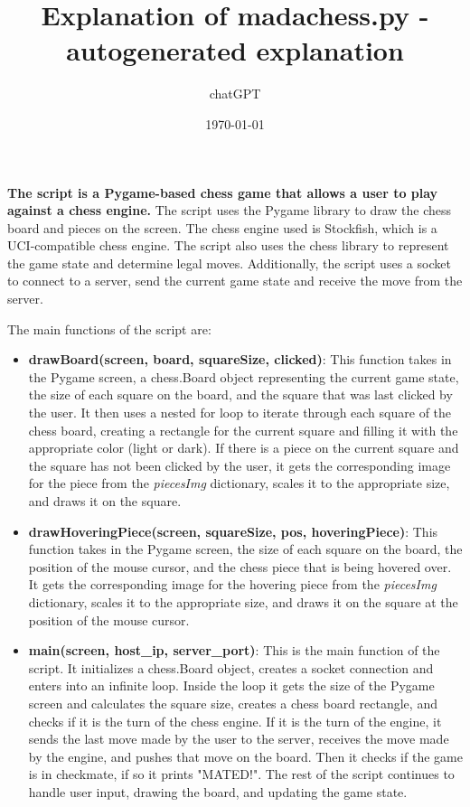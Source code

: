 \documentclass{article}
\title{Explanation of madachess.py - autogenerated explanation}
\author{chatGPT}
\date{\today}
\begin{document}
\maketitle
\textbf{The script is a Pygame-based chess game that allows a user to play against a chess engine.} The script uses the Pygame library to draw the chess board and pieces on the screen. The chess engine used is Stockfish, which is a UCI-compatible chess engine. The script also uses the chess library to represent the game state and determine legal moves. Additionally, the script uses a socket to connect to a server, send the current game state and receive the move from the server.

The main functions of the script are:

\begin{itemize}
    \item \textbf{drawBoard(screen, board, squareSize, clicked)}: This function takes in the Pygame screen, a chess.Board object representing the current game state, the size of each square on the board, and the square that was last clicked by the user. It then uses a nested for loop to iterate through each square of the chess board, creating a rectangle for the current square and filling it with the appropriate color (light or dark). If there is a piece on the current square and the square has not been clicked by the user, it gets the corresponding image for the piece from the \textit{piecesImg} dictionary, scales it to the appropriate size, and draws it on the square.
    \item \textbf{drawHoveringPiece(screen, squareSize, pos, hoveringPiece)}: This function takes in the Pygame screen, the size of each square on the board, the position of the mouse cursor, and the chess piece that is being hovered over. It gets the corresponding image for the hovering piece from the \textit{piecesImg} dictionary, scales it to the appropriate size, and draws it on the square at the position of the mouse cursor.
    \item \textbf{main(screen, host\_ip, server\_port)}: This is the main function of the script. It initializes a chess.Board object, creates a socket connection and enters into an infinite loop. Inside the loop it gets the size of the Pygame screen and calculates the square size, creates a chess board rectangle, and checks if it is the turn of the chess engine. If it is the turn of the engine, it sends the last move made by the user to the server, receives the move made by the engine, and pushes that move on the board. Then it checks if the game is in checkmate, if so it prints "MATED!". The rest of the script continues to handle user input, drawing the board, and updating the game state.
\end{itemize}
\end{document}
